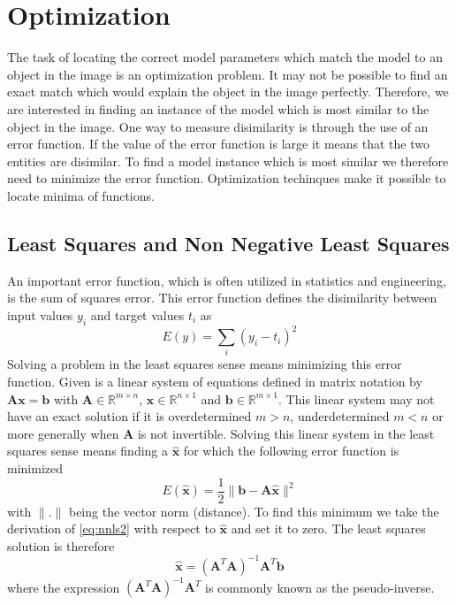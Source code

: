 \documentclass[11pt,a4paper]{report}
\begin{document}
\section{Optimization}
The task of locating the correct model parameters which match the model to an
object in the image is an optimization problem. It may not be possible to find
an exact match which would explain the object in the image perfectly. Therefore,
we are interested in finding an instance of the model which is most similar to the
object in the image. One way to measure disimilarity is through the use of an error function. If the
value of the error function is large it means that the two entities are
disimilar. To find a model instance which is most similar we therefore need to
minimize the error function. Optimization techinques make it possible to locate
minima of functions.

\subsection{Least Squares and Non Negative Least Squares}
An important error function, which is often utilized in statistics and engineering, is the
sum of squares error. This error function defines the disimilarity between input values $y_i$ and target values $t_i$ as
\begin{equation}\label{eq:nnls}
E(y) = \sum_i (y_i - t_i)^2
\end{equation}
Solving a problem in the least squares sense means minimizing this error
function. Given is a linear system of equations defined in matrix notation by
$\mathbf{A}\mathbf{x} = \mathbf{b}$ with $\mathbf{A} \in \mathbb{R}^{m\times
  n}$, $\mathbf{x} \in \mathbb{R}^{n\times 1}$ and $\mathbf{b} \in
\mathbb{R}^{m\times 1}$. This linear system may not have an exact solution if it
is overdetermined $m > n$, underdetermined $m < n$  or more generally when
$\mathbf{A}$ is not invertible. Solving this linear system in the least squares sense
means finding a $\mathbf{\hat{x}}$ for which the following error function is
minimized
\begin{equation}\label{eq:nnls2}
E(\mathbf{\hat{x}}) = \frac{1}{2}\lVert \mathbf{b} - \mathbf{A\hat{x}} \rVert^2
\end{equation}
with $\lVert . \rVert$ being the vector norm (distance).
To find this minimum we take the derivation of \ref{eq:nnls2} with respect to
$\mathbf{\hat{x}}$ and set it to zero. The least squares solution is therefore
\begin{equation}\label{eq:nnls2}
\mathbf{\hat{x}} = (\mathbf{A}^T\mathbf{A})^{-1}\mathbf{A}^T\mathbf{b}
\end{equation}
where the expression $(\mathbf{A}^T\mathbf{A})^{-1}\mathbf{A}^T$ is commonly
known as the pseudo-inverse.
\end{document}
